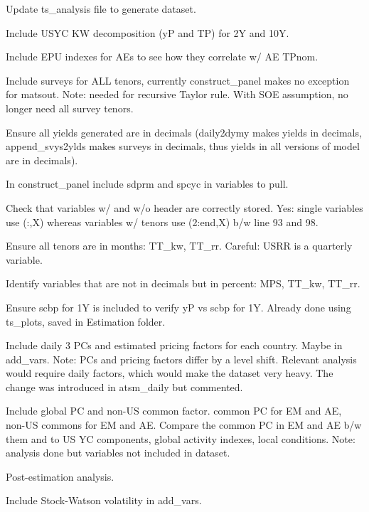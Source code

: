 \documentclass[12pt]{article}
\newcommand{\cmark}{\ding{51}}
\newcommand{\xmark}{\ding{55}}
\newcommand{\done}{\rlap{$\square$}{\raisebox{2pt}{\large\hspace{1pt}\cmark}}%
	\hspace{-2.5pt}}
\newcommand{\wontdo}{\rlap{$\square$}{\large\hspace{1pt}\xmark}}
\begin{document}
\begin{todolist}
	\begin{todolist}
		\item[\done] Update ts_analysis file to generate dataset.
		\item[\done] Include USYC KW decomposition (yP and TP) for 2Y and 10Y.
		\item[\done] Include EPU indexes for AEs to see how they correlate w/ AE TPnom.
		\item[\wontdo] Include surveys for ALL tenors, currently construct_panel makes no exception for matsout. Note: needed for recursive Taylor rule. With SOE assumption, no longer need all survey tenors.
		\item[\done] Ensure all yields generated are in decimals (daily2dymy makes yields in decimals, append_svys2ylds makes surveys in decimals, thus yields in all versions of model are in decimals).
		\item[\done] In construct_panel include sdprm and spcyc in variables to pull.
		\item[\done] Check that variables w/ and w/o header are correctly stored. Yes: single variables use (:,X) whereas variables w/ tenors use (2:end,X) b/w line 93 and 98.
		\item[\done] Ensure all tenors are in months: TT_kw, TT_rr. Careful: USRR is a quarterly variable.
		\item[\done] Identify variables that are not in decimals but in percent: MPS, TT_kw, TT_rr.
		\item[\wontdo] Ensure scbp for 1Y is included to verify yP vs scbp for 1Y. Already done using ts_plots, saved in Estimation folder.
		\item[\wontdo] Include daily 3 PCs and estimated pricing factors for each country. Maybe in add_vars. Note: PCs and pricing factors differ by a level shift. Relevant analysis would require daily factors, which would make the dataset very heavy. The change was introduced in atsm_daily but commented.
		\item[\done] Include global PC and non-US common factor. common PC for EM and AE, non-US commons for EM and AE. Compare the common PC in EM and AE b/w them and to US YC components, global activity indexes, local conditions. Note: analysis done but variables not included in dataset.
	\end{todolist}
	\item[\done] Post-estimation analysis.
	\begin{todolist}
		\item[\done] Include Stock-Watson volatility in add_vars.

\end{todolist}
\end{todolist}
\end{document}
